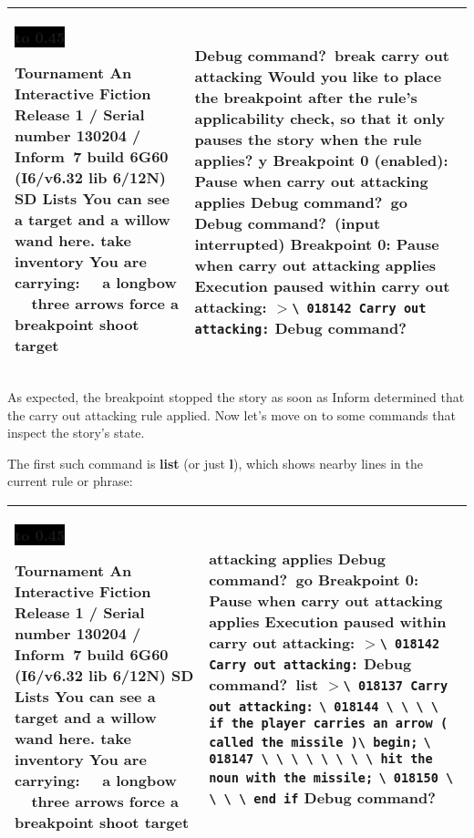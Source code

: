\documentclass{book}
\newcommand{\n}{\hspace*{\fill}\newline}
\newcommand{\terp}[2]{\begin{center}\begin{tabular}{p{0.45\textwidth}|p{0.45\textwidth}}\midrule #1&#2\\\midrule\end{tabular}\end{center}}
\newcommand{\glkheading}[1]{\textbf{#1}}
\newcommand{\glkinput}[1]{\textbf{#1}}
\newcommand{\glkstatusline}[2]{\centerline{\colorbox{black}{\hbox to 0.45\textwidth{\textcolor{white}{#1\hfil #2}}}}}
\newcommand{\storyprompt}{\raisebox{1.5pt}{\(>\)}}
\newcommand{\cursor}{\raisebox{-1.5pt}{\RectangleThin}}
\newcommand{\markedindent}{\(>\)}
\newcommand{\unmarkedindent}{\hphantom{\(>\)}}
\begin{document}
\terp{\glkstatusline{Lists}{0/2}\n
  \glkheading{Tournament}\n
  An Interactive Fiction\n
  Release 1 / Serial number 130204 / Inform~7 build 6G60 (I6/v6.32 lib 6/12N) SD\n
  \n
  \glkheading{Lists}\n
  You can see a target and a willow wand here.\n
  \n
  \storyprompt\glkinput{take inventory}\n
  You are carrying:\n
  \null\ \ a longbow\n
  \null\ \ three arrows\n
  \n
  \storyprompt\glkinput{force a breakpoint}\n
  \storyprompt\glkinput{shoot target}}{%
  \n
  Debug command?\ \glkinput{break carry out attacking}\n
  \n
  Would you like to place the breakpoint after the rule's applicability check, so that it only pauses the story when the rule applies? \glkinput{y}\n
  \n
  Breakpoint 0 (enabled): Pause when carry out attacking applies\n
  \n
  Debug command?\ \glkinput{go}\n
  \n
  Debug command?\ (input interrupted)\n
  \n
  \glkheading{Breakpoint 0:} Pause when carry out attacking applies\n
  \n
  Execution paused within carry out attacking:\n
  \markedindent \lstinline{\ 018142 Carry out attacking:}\n
  \n
  Debug command?\ \cursor}

As expected, the breakpoint stopped the story as soon as Inform determined that
the carry out attacking rule applied.  Now let's move on to some commands that
inspect the story's state.

The first such command is \glkinput{list} (or just \glkinput{l}), which shows
nearby lines in the current rule or phrase:

\terp{\glkstatusline{Lists}{0/2}\n
  \glkheading{Tournament}\n
  An Interactive Fiction\n
  Release 1 / Serial number 130204 / Inform~7 build 6G60 (I6/v6.32 lib 6/12N) SD\n
  \n
  \glkheading{Lists}\n
  You can see a target and a willow wand here.\n
  \n
  \storyprompt\glkinput{take inventory}\n
  You are carrying:\n
  \null\ \ a longbow\n
  \null\ \ three arrows\n
  \n
  \storyprompt\glkinput{force a breakpoint}\n
  \storyprompt\glkinput{shoot target}}{%
  attacking applies\n
  \n
  Debug command?\ \glkinput{go}\n
  \n
  \glkheading{Breakpoint 0:} Pause when carry out attacking applies\n
  \n
  Execution paused within carry out attacking:\n
  \markedindent \lstinline{\ 018142 Carry out attacking:}\n
  \n
  Debug command?\ \glkinput{list}\n
  \n
  \markedindent \lstinline{\ 018137 Carry out attacking:}\n
  \unmarkedindent \lstinline{\ 018144 \ \ \ \ if the player carries an arrow ( called the missile )}\lstinline{\ begin;}\n
  \unmarkedindent \lstinline{\ 018147 \ \ \ \ \ \ \ \ hit the noun with the missile;}\n
  \unmarkedindent \lstinline{\ 018150 \ \ \ \ end if}\n
  \n
  Debug command?\ \cursor}
\end{document}
